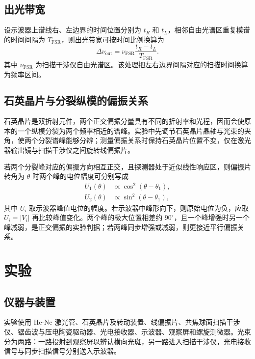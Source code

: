 \documentclass[UTF8,a4paper,10pt]{ctexart}
\begin{document}
\subsection{出光带宽}

设示波器上谱线右、左边界的时间位置分别为 $t_R$ 和 $t_L$，相邻自由光谱区重复模谱的时间间隔为 $T_{\mathrm{FSR}}$，则出光带宽可按时间比例换算为
\begin{equation}
  \Delta\nu_{\mathrm{out}}
  =\nu_{\mathrm{FSR}}\frac{t_R-t_L}{T_{\mathrm{FSR}}}. \label{eq:bandwidth}
\end{equation}
其中 $\nu_{\mathrm{FSR}}$ 为扫描干涉仪自由光谱区。该处理把左右边界间隔对应的扫描时间换算为频率区间。

\subsection{石英晶片与分裂纵模的偏振关系}

石英晶片是双折射元件，两个正交偏振分量具有不同的折射率和光程，因而会使原本的一个纵模分裂为两个频率相近的谱峰。实验中先调节石英晶片晶轴与光束的夹角，使两个分裂谱峰能够分辨；测量偏振关系时保持石英晶片位置不变，仅在激光器输出镜与扫描干涉仪之间旋转线偏振片。

若两个分裂峰对应的偏振方向相互正交，且探测器处于近似线性响应区，则偏振片转角为 $\theta$ 时两个峰的电位幅度可分别写成
\begin{align}
  U_1(\theta) &\propto \cos^2(\theta-\theta_1),\\
  U_2(\theta) &\propto \sin^2(\theta-\theta_1),
\end{align}
其中 $U_i$ 取示波器峰值电位的幅度。若示波器中峰形向下，则原始电位为负，应取 $U_i=|V_i|$ 再比较峰值变化。两个峰的极大位置相差约 $90^\circ$，且一个峰增强时另一个峰减弱，是正交偏振的实验判据；若两峰同步增强或减弱，则更接近平行偏振关系\cite{guide}。

\section{实验}


\subsection{仪器与装置}

实验使用 He-Ne 激光管、石英晶片及转动装置、线偏振片、共焦球面扫描干涉仪、锯齿波与压电陶瓷驱动器、光电接收器、示波器、观察屏和螺旋测微器。光束分为两路：一路投射到观察屏以辨认横向光斑，另一路进入扫描干涉仪，光电接收信号与同步扫描信号分别送入示波器。
\end{document}
